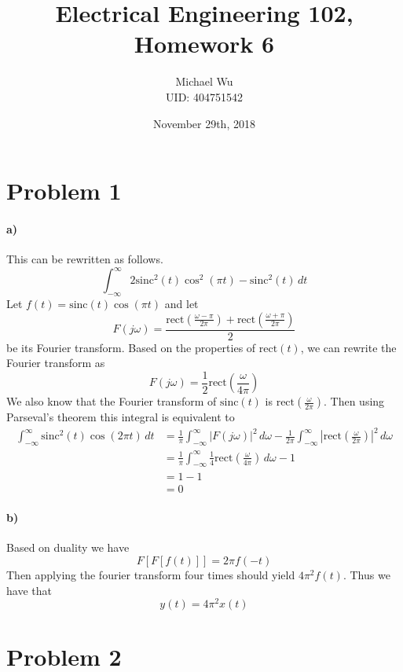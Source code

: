 \documentclass[12pt]{article}
\begin{document}
\title{Electrical Engineering 102, Homework 6}
\date{November 29th, 2018}
\author{Michael Wu\\UID: 404751542}
\maketitle

\section*{Problem 1}

\paragraph{a)}

This can be rewritten as follows.
\[\int_{-\infty}^\infty 2\text{sinc}^2(t)\cos^2(\pi t) - \text{sinc}^2(t)\, dt\]
Let \(f(t)=\text{sinc}(t)\cos(\pi t)\) and let
\[F(j\omega)=\frac{\text{rect}\left(\frac{\omega-\pi}{2\pi}\right)+\text{rect}\left(\frac{\omega+\pi}{2\pi}\right)}{2}\]
be its Fourier transform. Based on the properties of \(\text{rect}(t)\), we can rewrite the Fourier transform as
\[F(j\omega)=\frac{1}{2}\text{rect}\left(\frac{\omega}{4\pi}\right)\]
We also know that the Fourier transform of \(\text{sinc}(t)\) is \(\text{rect}\left(\frac{\omega}{2\pi}\right)\).
Then using Parseval's theorem this integral is equivalent to
\begin{align*}
    \int_{-\infty}^\infty \text{sinc}^2(t)\cos(2\pi t)\, dt
    &=\frac{1}{\pi}\int_{-\infty}^{\infty} |F(j\omega)|^2\,d\omega - \frac{1}{2\pi} \int_{-\infty}^\infty \left|\text{rect}\left(\frac{\omega}{2\pi}\right)\right|^2\,d\omega\\
    &=\frac{1}{\pi}\int_{-\infty}^{\infty}\frac{1}{4}\text{rect}\left(\frac{\omega}{4\pi}\right)\,d\omega - 1\\
    &=1-1\\
    &=0
\end{align*}

\paragraph{b)}

Based on duality we have
\[F[F[f(t)]]=2\pi f(-t)\]
Then applying the fourier transform four times should yield \(4\pi^2 f(t)\). Thus we have that
\[y(t)=4\pi^2x(t)\]

\section*{Problem 2}
\end{document}

